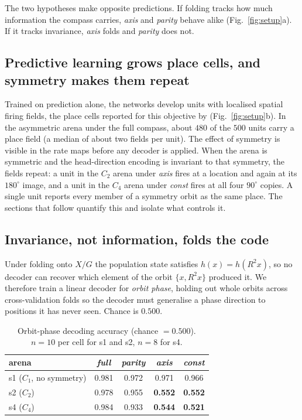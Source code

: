 \documentclass[9pt,lineno]{elife}
\begin{document}
The two hypotheses make opposite predictions. If folding tracks how much information the
compass carries, \textit{axis} and \textit{parity} behave alike (Fig.~\ref{fig:setup}a). If
it tracks invariance, \textit{axis} folds and \textit{parity} does not.

\subsection{Predictive learning grows place cells, and symmetry makes them repeat}

Trained on prediction alone, the networks develop units with localised spatial firing fields,
the place cells reported for this objective by \citet{levenstein2024}
(Fig.~\ref{fig:setup}b). In the asymmetric arena under the full compass, about $480$ of the
$500$ units carry a place field (a median of about two fields per unit). The effect of symmetry is visible in the rate maps
before any decoder is applied. When the arena is symmetric and the head-direction encoding is
invariant to that symmetry, the fields repeat: a unit in the $C_2$ arena under \textit{axis}
fires at a location and again at its $180^\circ$ image, and a unit in the $C_4$ arena under
\textit{const} fires at all four $90^\circ$ copies. A single unit reports every member of a
symmetry orbit as the same place. The sections that follow quantify this and isolate what
controls it.


\subsection{Invariance, not information, folds the code}

Under folding onto $X/G$ the population state satisfies $h(x) = h(R^2x)$, so no decoder can
recover which element of the orbit $\{x, R^2x\}$ produced it. We therefore train a linear
decoder for \emph{orbit phase}, holding out whole orbits across cross-validation folds so the
decoder must generalise a phase direction to positions it has never seen. Chance is $0.500$.

\begin{table}[t]
\centering
\caption{Orbit-phase decoding accuracy (chance $=0.500$). $n=10$ per cell for s1 and s2,
$n=8$ for s4.}
\label{tab:phase}
\begin{tabular}{lcccc}
\toprule
arena & \textit{full} & \textit{parity} & \textit{axis} & \textit{const} \\
\midrule
s1 ($C_1$, no symmetry) & 0.981 & 0.972 & 0.971 & 0.966 \\
s2 ($C_2$)              & 0.978 & 0.955 & \textbf{0.552} & \textbf{0.552} \\
s4 ($C_4$)              & 0.984 & 0.933 & \textbf{0.544} & \textbf{0.521} \\
\bottomrule
\end{tabular}
\end{table}
\end{document}
